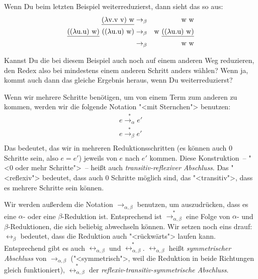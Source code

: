 Wenn Du beim letzten Beispiel weiterreduzierst, dann sieht das so aus:
%
\begin{eqnarray*}
  \underline{(\lambda \mathrm v .\mathrm v~\mathrm v)~\mathrm w} & \rightarrow_{\beta} & \mathrm w~\mathrm w\\
  \underline{((\lambda \mathrm u.\mathrm u)~\mathrm w)}~((\lambda \mathrm u.\mathrm u)~\mathrm w)
  & \rightarrow_{\beta} & 
  \mathrm w~\underline{((\lambda \mathrm u.\mathrm u)~\mathrm w)} \\
  & \rightarrow_{\beta} & \mathrm w~\mathrm w
\end{eqnarray*}
%
\begin{aufgabeinline}
  Kannst Du die bei diesem Beispiel auch noch auf einem anderen Weg
  reduzieren, den Redex also bei mindestens einem anderen Schritt
  anders wählen?  Wenn ja, kommt auch dann das gleiche Ergebnis
  heraus, wenn Du weiterreduzierst?
\end{aufgabeinline}
%
Wenn wir mehrere Schritte benötigen, um von einem Term zum anderen zu
kommen, werden wir die folgende Notation "<mit Sternchen"> benutzen:
%
\begin{eqnarray*}
  e \overset{\ast}{\rightarrow_\alpha} e'\\
  e \overset{\ast}{\rightarrow_\beta} e'\\
\end{eqnarray*}
%
Das bedeutet, das wir in mehreren Reduktionsschritten (es können auch
0 Schritte sein, also $e = e'$) jeweils von $e$ nach $e'$ kommen.
Diese Konstruktion~-- "<0 oder mehr Schritte">~-- heißt auch
\textit{transitiv-reflexiver Abschluss}.  Das "<reflexiv">
bedeutet, dass auch 0 Schritte möglich sind, das "<transitiv">, dass
es mehrere Schritte sein können.

Wir werden außerdem die Notation $\rightarrow_{\alpha,\beta}$
benutzen, um auszudrücken, dass es eine $\alpha$- oder eine
$\beta$-Reduktion ist.  Entsprechend ist
$\overset{\ast}{\rightarrow_{\alpha,\beta}}$ eine Folge von $\alpha$-
und $\beta$-Reduktionen, die sich beliebig abwechseln können.  Wir
setzen noch eins drauf: $\leftrightarrow_\beta$ bedeutet, dass die
Reduktion auch "<rückwärts"> laufen kann.  Entsprechend gibt es auch
$\leftrightarrow_{\alpha, \beta}$ und
$\overset{\ast}{\leftrightarrow_{\alpha,\beta}}$.
$\leftrightarrow_{\alpha, \beta}$ heißt \textit{symmetrischer
  Abschluss} von $\rightarrow_{\alpha,
  \beta}$ ("<symmetrisch">, weil die Reduktion in beide Richtungen
gleich funktioniert), $\overset{\ast}{\leftrightarrow_{\alpha,\beta}}$
der \textit{reflexiv-transitiv-symmetrische Abschluss}.

